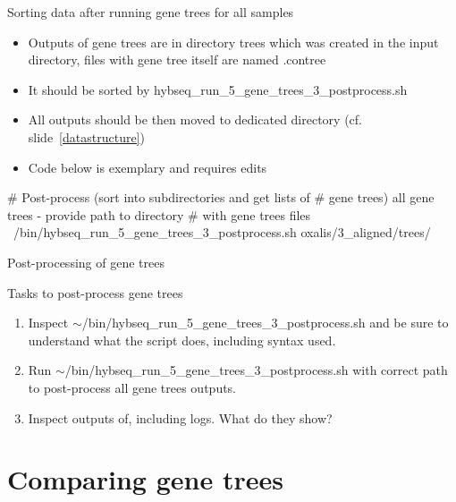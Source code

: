 \documentclass[compress, ucs, xelatex, 11pt, xcolor=x11names, aspectratio=169,
	hyperref={
		bookmarks=true,
		unicode=true,
		colorlinks=true,
		pdftitle={HybSeq course},
		plainpages=false,
		pdfauthor={Vojtech Zeisek},
		pdfsubject={Practical processing of HybSeq target enrichment sequencing data on computing grids like MetaCentrum},
		pdfcreator={XeLaTeX},
		pdfkeywords={BASH, command line, GNU, HybSeq, Linux, MetaCentrum, sequencing shell, target enrichment},
		linkcolor=Turquoise4, %
		anchorcolor=DodgerBlue4, %
		citecolor=DodgerBlue4, %
		filecolor=DodgerBlue4, %
		menucolor=Tan4, %
		urlcolor=DarkOliveGreen4, %
		pdftex},
	url={hyphens, lowtilde} %
	]{beamer}
\renewcommand{\texttt}[1]{\colorbox{Cornsilk2}{{\ttfamily #1}}}
\renewcommand{\alert}[1]{\textcolor{OrangeRed3}{#1}}
\begin{document}
\begin{frame}[fragile]{Sorting data after running gene trees for all samples}
	\begin{itemize}
		\item Outputs of gene trees are in directory \texttt{trees} which was created in the input directory, files with gene tree itself are named \texttt{*.contree}
		\item It should be sorted by \texttt{hybseq\_run\_5\_gene\_trees\_3\_postprocess.sh}
		\item All outputs should be then moved to dedicated directory (cf. slide~\ref{datastructure})
		\item \alert{Code below is exemplary and requires edits}
	\end{itemize}
	\begin{bashcode}
    # Post-process (sort into subdirectories and get lists of
    # gene trees) all gene trees - provide path to directory
    # with gene trees files
    ~/bin/hybseq_run_5_gene_trees_3_postprocess.sh oxalis/3_aligned/trees/
	\end{bashcode}
\end{frame}

\begin{frame}{Post-processing of gene trees}
	\begin{exampleblock}{Tasks to post-process gene trees}
		\begin{enumerate}
			\item Inspect \texttt{$\sim$/bin/hybseq\_run\_5\_gene\_trees\_3\_postprocess.sh} and be sure to understand what the script does, including syntax used.
			\item Run \texttt{$\sim$/bin/hybseq\_run\_5\_gene\_trees\_3\_postprocess.sh}  with correct path to post-process all gene trees outputs.
			\item Inspect outputs of, including logs. What do they show?
		\end{enumerate}
	\end{exampleblock}
\end{frame}

\section{Comparing gene trees}
\end{document}
